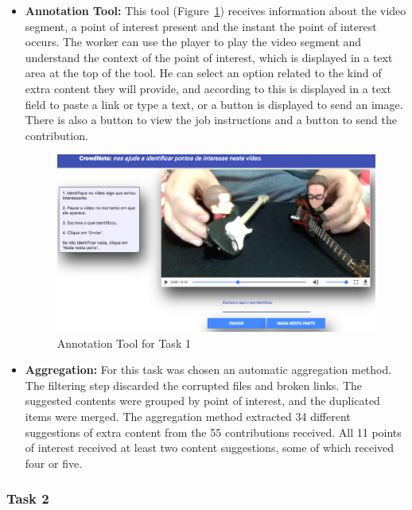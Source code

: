 \begin{itemize}
\item \textbf{Annotation Tool:} This tool (Figure~\ref{task_1}) receives information about the video segment, a point of interest present and the instant the point of interest occurs. The worker can use the player to play the video segment and understand the context of the point of interest, which is displayed in a text area at the top of the tool. He can select an option related to the kind of extra content they will provide, and according to this is displayed in a text field to paste a link or type a text, or a button is displayed to send an image. There is also a button to view the job instructions and a button to send the contribution.
\begin{figure}[h!]
	\centerline{\includegraphics[scale=0.155] {figure/task_1}}
	\caption{Annotation Tool for Task 1}
	\label{task_1}
\end{figure}

\item \textbf{Aggregation:} For this task was chosen an automatic aggregation method. The filtering step discarded the corrupted files and broken links. The suggested contents were grouped by point of interest, and the duplicated items were merged. The aggregation method extracted 34 different suggestions of extra content from the 55 contributions received. All 11 points of interest received at least two content suggestions, some of which received four or five. 

\end{itemize}


\subsubsection{Task 2}



